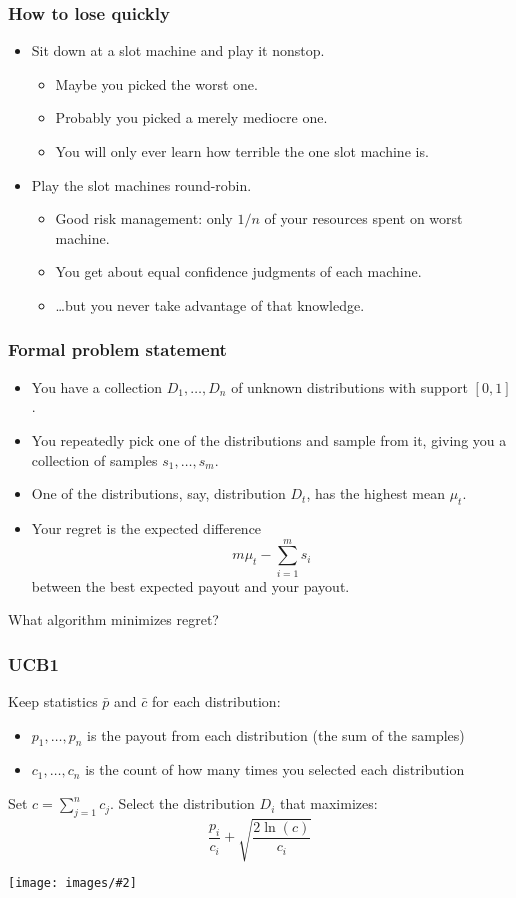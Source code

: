 \documentclass[table]{beamer}
\newcommand\img[2]{\texttt{[image: images/\#2]}}
\begin{document}
\begin{frame}
	\frametitle{How to lose quickly}
	\begin{itemize}
		\item Sit down at a slot machine and play it nonstop.
			\begin{itemize}
				\item Maybe you picked the worst one.
				\item Probably you picked a merely mediocre one.
				\item You will only ever learn how terrible the one slot
					machine is.
			\end{itemize}
		\item Play the slot machines round-robin.
			\begin{itemize}
				\item Good risk management: only $1/n$ of your resources
					spent on worst machine.
				\item You get about equal confidence judgments of each
					machine.
				\item \ldots{}but you never take advantage of that
					knowledge.
			\end{itemize}
	\end{itemize}
\end{frame}

\begin{frame}
	\frametitle{Formal problem statement}
	\begin{itemize}
		\item You have a collection $D_1,\ldots,D_n$ of unknown distributions with
			support $[0,1]$.
		\item You repeatedly pick one of the distributions and sample from
			it, giving you a collection of samples $s_1,\ldots,s_m$.
		\item One of the distributions, say, distribution $D_t$, has the
			highest mean $\mu_t$.
		\item Your \alert{regret} is the expected difference
			\[m\mu_t - \sum_{i=1}^m s_i\]
			between the best expected payout and your payout.
	\end{itemize}

	What algorithm minimizes regret?
\end{frame}

\begin{frame}
	\frametitle{UCB1}
	Keep statistics $\bar p$ and $\bar c$ for each distribution:
	\begin{itemize}
		\item $p_1,\ldots,p_n$ is the \alert{payout} from each distribution (the sum
			of the samples)
		\item $c_1,\ldots,c_n$ is the \alert{count} of how many times you
			selected each distribution
	\end{itemize}
	Set $c=\sum_{j=1}^n c_j$. Select the distribution $D_i$ that maximizes:
	\[\frac{p_i}{c_i} + \sqrt{\frac{2\ln(c)}{c_i}}\]

	\pause

	\begin{center}
		\img{0.4}{confused.jpg}
	\end{center}
\end{frame}
\end{document}

